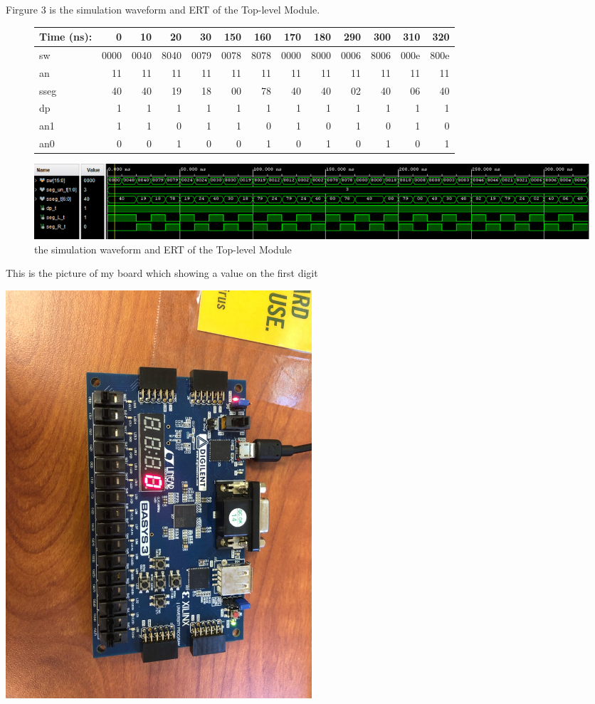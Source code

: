 \documentclass[11pt]{article}
\begin{document}
	Firgure 3 is the simulation waveform and ERT of the Top-level Module.
	\begin{figure}[ht]\centering
		\begin{tabular}{l|rrrr|rrrr|rrrr}
			Time (ns): & 0 & 10 & 20 & 30 & 150 & 160 & 170 & 180 & 290 & 300 & 310 & 320\\
			\midrule
			sw & 0000 & 0040 & 8040 & 0079 & 0078 & 8078 & 0000 & 8000 & 0006 & 8006 & 000e & 800e \\
			\midrule
			an & 11 & 11 & 11 & 11 & 11 & 11 & 11 & 11 & 11 & 11 & 11 & 11\\
			sseg & 40 & 40 & 19 & 18 & 00 & 78 & 40 & 40 & 02 & 40 & 06 & 40 \\
			dp & 1 & 1 & 1 & 1 & 1 & 1 & 1 & 1 & 1 & 1 & 1 & 1 \\
			an1 & 1 & 1 & 0 & 1 & 1 & 0 & 1 & 0 & 1 & 0 & 1 & 0 \\
			an0 & 0 & 0 & 1 & 0 & 0 & 1 & 0 & 1 & 0 & 1 & 0 & 1 \\
			\bottomrule
		\end{tabular}\medskip
		
		\includegraphics[width=1.1\textwidth]{sseg1_simulation}
		\caption{the simulation waveform and ERT of the Top-level Module}
		\label{fig:sseg1}
	\end{figure}
	
	This is the picture of my board which showing a value on the first digit\\
	\begin{center}
		\includegraphics[width=0.5\textwidth]{board_picture1}
	\end{center}
	
\end{document}
